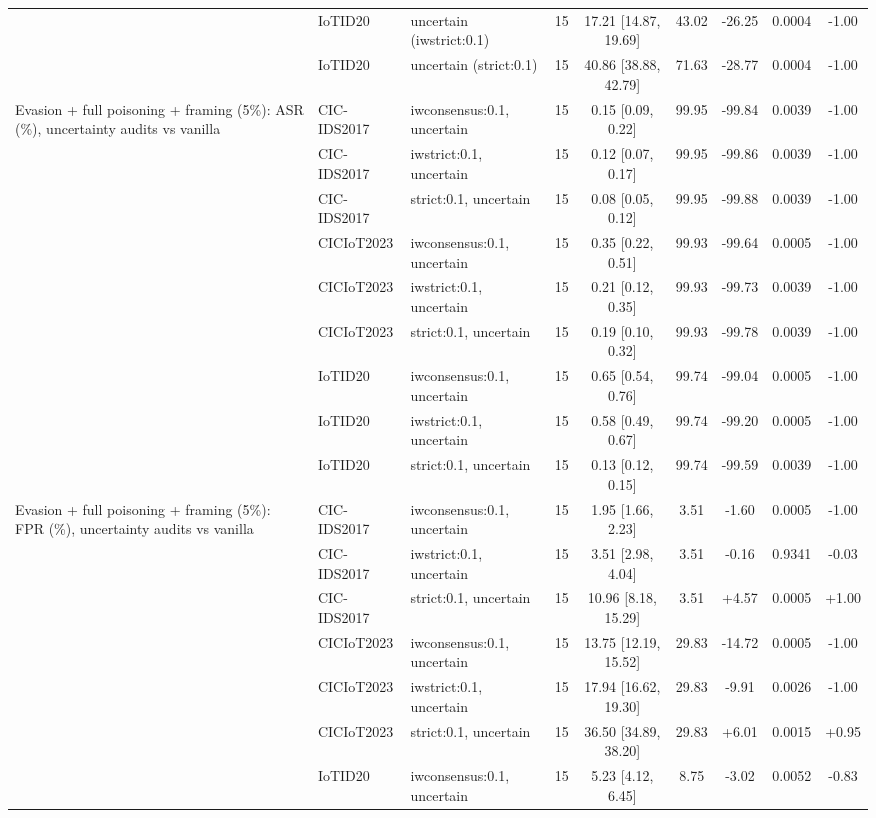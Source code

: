 \begin{table}[t]
\begin{tabular}{lllcccccc}
 & IoTID20 & uncertain (iwstrict:0.1) & 15 & 17.21 [14.87, 19.69] & 43.02 & -26.25 & 0.0004 & -1.00 \\
 & IoTID20 & uncertain (strict:0.1) & 15 & 40.86 [38.88, 42.79] & 71.63 & -28.77 & 0.0004 & -1.00 \\
Evasion + full poisoning + framing (5\%): ASR (\%), uncertainty audits vs vanilla & CIC-IDS2017 & iwconsensus:0.1, uncertain & 15 & 0.15 [0.09, 0.22] & 99.95 & -99.84 & 0.0039 & -1.00 \\
 & CIC-IDS2017 & iwstrict:0.1, uncertain & 15 & 0.12 [0.07, 0.17] & 99.95 & -99.86 & 0.0039 & -1.00 \\
 & CIC-IDS2017 & strict:0.1, uncertain & 15 & 0.08 [0.05, 0.12] & 99.95 & -99.88 & 0.0039 & -1.00 \\
 & CICIoT2023 & iwconsensus:0.1, uncertain & 15 & 0.35 [0.22, 0.51] & 99.93 & -99.64 & 0.0005 & -1.00 \\
 & CICIoT2023 & iwstrict:0.1, uncertain & 15 & 0.21 [0.12, 0.35] & 99.93 & -99.73 & 0.0039 & -1.00 \\
 & CICIoT2023 & strict:0.1, uncertain & 15 & 0.19 [0.10, 0.32] & 99.93 & -99.78 & 0.0039 & -1.00 \\
 & IoTID20 & iwconsensus:0.1, uncertain & 15 & 0.65 [0.54, 0.76] & 99.74 & -99.04 & 0.0005 & -1.00 \\
 & IoTID20 & iwstrict:0.1, uncertain & 15 & 0.58 [0.49, 0.67] & 99.74 & -99.20 & 0.0005 & -1.00 \\
 & IoTID20 & strict:0.1, uncertain & 15 & 0.13 [0.12, 0.15] & 99.74 & -99.59 & 0.0039 & -1.00 \\
Evasion + full poisoning + framing (5\%): FPR (\%), uncertainty audits vs vanilla & CIC-IDS2017 & iwconsensus:0.1, uncertain & 15 & 1.95 [1.66, 2.23] & 3.51 & -1.60 & 0.0005 & -1.00 \\
 & CIC-IDS2017 & iwstrict:0.1, uncertain & 15 & 3.51 [2.98, 4.04] & 3.51 & -0.16 & 0.9341 & -0.03 \\
 & CIC-IDS2017 & strict:0.1, uncertain & 15 & 10.96 [8.18, 15.29] & 3.51 & +4.57 & 0.0005 & +1.00 \\
 & CICIoT2023 & iwconsensus:0.1, uncertain & 15 & 13.75 [12.19, 15.52] & 29.83 & -14.72 & 0.0005 & -1.00 \\
 & CICIoT2023 & iwstrict:0.1, uncertain & 15 & 17.94 [16.62, 19.30] & 29.83 & -9.91 & 0.0026 & -1.00 \\
 & CICIoT2023 & strict:0.1, uncertain & 15 & 36.50 [34.89, 38.20] & 29.83 & +6.01 & 0.0015 & +0.95 \\
 & IoTID20 & iwconsensus:0.1, uncertain & 15 & 5.23 [4.12, 6.45] & 8.75 & -3.02 & 0.0052 & -0.83 \\

\end{tabular}
\end{table}
